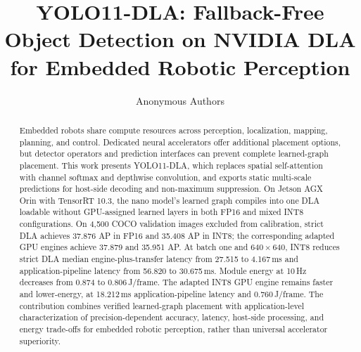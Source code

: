 \documentclass[letterpaper,10pt,conference]{ieeeconf}
\title{\LARGE\bf YOLO11-DLA: Fallback-Free Object Detection on NVIDIA DLA\\
for Embedded Robotic Perception}
\author{Anonymous Authors}
\begin{document}
\maketitle
\thispagestyle{empty}
\pagestyle{empty}
\begin{abstract}
Embedded robots share compute resources across perception, localization,
mapping, planning, and control. Dedicated neural accelerators offer additional
placement options, but detector operators and prediction interfaces can
prevent complete learned-graph placement. This work presents YOLO11-DLA, which replaces spatial
self-attention with channel softmax and depthwise convolution, and exports
static multi-scale predictions for host-side decoding and non-maximum suppression.
On Jetson AGX Orin with TensorRT 10.3, the nano model's learned graph compiles into one DLA
loadable without GPU-assigned learned layers in both FP16 and mixed INT8
configurations. On 4,500 COCO validation images excluded from calibration,
strict DLA achieves 37.876 AP in FP16 and 35.408 AP in INT8; the corresponding
adapted GPU engines achieve 37.879 and 35.951 AP. At batch one and
$640\times640$, INT8 reduces strict DLA median engine-plus-transfer latency
from 27.515 to 4.167\,ms and application-pipeline latency from 56.820 to
30.675\,ms. Module energy at 10\,Hz decreases from 0.874 to 0.806\,J/frame.
The adapted INT8 GPU engine remains faster and lower-energy, at 18.212\,ms
application-pipeline latency and 0.760\,J/frame. The contribution combines verified
learned-graph placement with application-level characterization of
precision-dependent accuracy, latency, host-side processing, and energy
trade-offs for embedded robotic perception, rather than universal accelerator
superiority.
\end{abstract}









\end{document}
